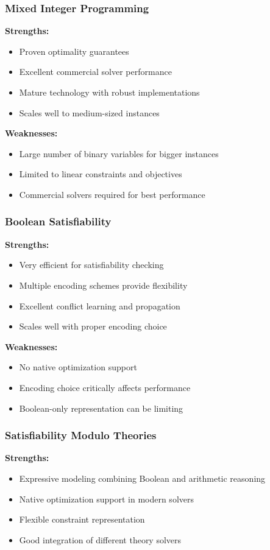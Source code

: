 \documentclass[11pt]{article}
\begin{document}
\subsubsection{Mixed Integer Programming}
\textbf{Strengths:}
\begin{itemize}
    \item Proven optimality guarantees
    \item Excellent commercial solver performance
    \item Mature technology with robust implementations
    \item Scales well to medium-sized instances
\end{itemize}

\textbf{Weaknesses:}
\begin{itemize}
    \item Large number of binary variables for bigger instances
    \item Limited to linear constraints and objectives
    \item Commercial solvers required for best performance
\end{itemize}

\subsubsection{Boolean Satisfiability}
\textbf{Strengths:}
\begin{itemize}
    \item Very efficient for satisfiability checking
    \item Multiple encoding schemes provide flexibility
    \item Excellent conflict learning and propagation
    \item Scales well with proper encoding choice
\end{itemize}

\textbf{Weaknesses:}
\begin{itemize}
    \item No native optimization support
    \item Encoding choice critically affects performance
    \item Boolean-only representation can be limiting
\end{itemize}

\subsubsection{Satisfiability Modulo Theories}
\textbf{Strengths:}
\begin{itemize}
    \item Expressive modeling combining Boolean and arithmetic reasoning
    \item Native optimization support in modern solvers
    \item Flexible constraint representation
    \item Good integration of different theory solvers
\end{itemize}
\end{document}
